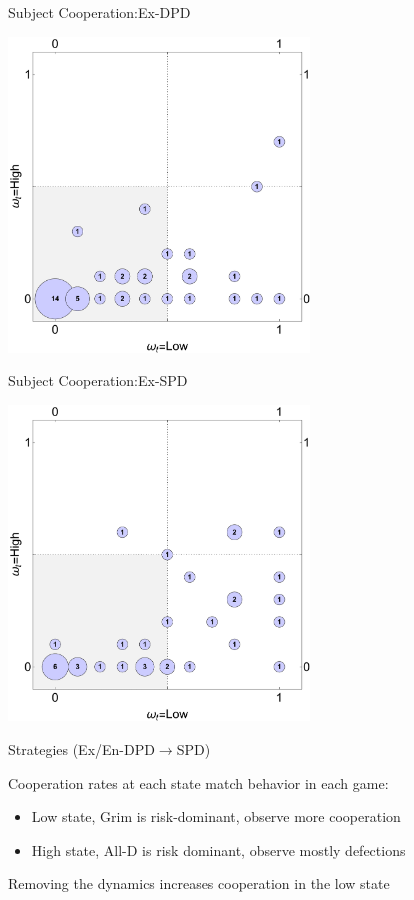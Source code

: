 \documentclass{beamer}
\begin{document}
\begin{frame}{Subject Cooperation:Ex-DPD}
\begin{card}
\begin{center}
	\includegraphics[width=0.6\textwidth]{./i/col_subject_stateCooperation_L5_ExDPD.pdf}
\end{center}
\end{card}
\end{frame}
\begin{frame}{Subject Cooperation:Ex-SPD}
\begin{card}
\begin{center}
	\includegraphics[width=0.6\textwidth]{./i/col_subject_stateCooperation_L5_ExIRPD.pdf}
\end{center}
\end{card}
\end{frame}

\begin{frame}{Strategies (Ex/En-DPD$\rightarrow$SPD)}

\begin{card}
 Cooperation rates at each state match behavior in each game:

\begin{itemize}
\item Low state, Grim is risk-dominant, observe more cooperation
\item High state, All-D is risk dominant, observe mostly defections
\end{itemize}
Removing the dynamics increases cooperation in the low state
\end{card}
\end{frame}
\end{document}
